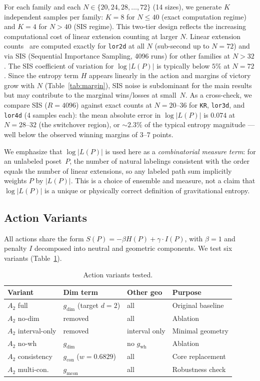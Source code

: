 \documentclass[entropy,article,submit,pdftex,moreauthors]{Definitions/mdpi}
\begin{document}
For each family and each $N \in \{20, 24, 28, \ldots, 72\}$ (14 sizes), we generate $K$ independent samples per family: $K = 8$ for $N \leq 40$ (exact computation regime) and $K = 4$ for $N > 40$ (SIS regime). This two-tier design reflects the increasing computational cost of linear extension counting at larger $N$. Linear extension counts~\cite{brightwell1991} are computed exactly for \texttt{lor2d} at all $N$ (sub-second up to $N = 72$) and via SIS (Sequential Importance Sampling, 4096 runs) for other families at $N > 32$. The SIS coefficient of variation for $\log|L(P)|$ is typically below $5\%$ at $N = 72$. Since the entropy term $H$ appears linearly in the action and margins of victory grow with $N$ (Table~\ref{tab:margin}), SIS noise is subdominant for the main results but may contribute to the marginal wins/losses at small~$N$. As a cross-check, we compare SIS ($R = 4096$) against exact counts at $N = 20$--$36$ for \texttt{KR}, \texttt{lor3d}, and \texttt{lor4d} (4 samples each): the mean absolute error in $\log|L(P)|$ is $0.074$ at $N = 28$--$32$ (the switchover region), or $\sim 2.3\%$ of the typical entropy magnitude --- well below the observed winning margins of $3$--$7$ points.

We emphasize that $\log|L(P)|$ is used here as a \emph{combinatorial measure term}: for an unlabeled poset~$P$, the number of natural labelings consistent with the order equals the number of linear extensions, so any labeled path sum implicitly weights $P$ by $|L(P)|$. This is a choice of ensemble and measure, not a claim that $\log|L(P)|$ is a unique or physically correct definition of gravitational entropy.

\subsection{Action Variants}

All actions share the form $S(P) = -\beta H(P) + \gamma \cdot I(P)$, with $\beta = 1$ and penalty $I$ decomposed into neutral and geometric components. We test six variants (Table~\ref{tab:variants}).

\begin{table}[H]
\caption{Action variants tested.\label{tab:variants}}
\begin{tabular}{llll}
\toprule
\textbf{Variant} & \textbf{Dim term} & \textbf{Other geo} & \textbf{Purpose} \\
\midrule
$A_2$ full & $g_{\text{dim}}$ (target $d{=}2$) & all & Original baseline \\
$A_2$ no-dim & removed & all & Ablation \\
$A_2$ interval-only & removed & interval only & Minimal geometry \\
$A_2$ no-wh & $g_{\text{dim}}$ & no $g_{\text{wh}}$ & Ablation \\
$A_2$ consistency & $g_{\text{con}}$ ($w{=}0.6829$) & all & Core replacement \\
$A_2$ multi-con. & $g_{\text{mcon}}$ & all & Robustness check \\
\bottomrule
\end{tabular}
\end{table}
\end{document}
